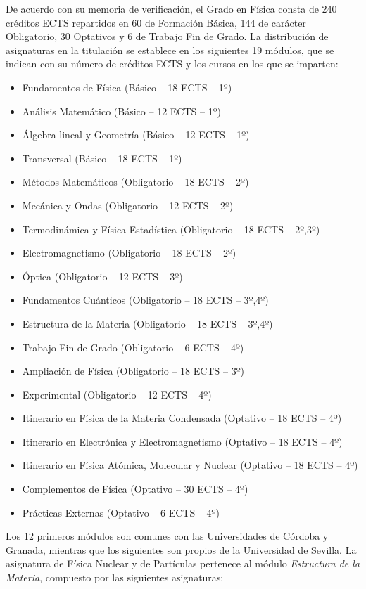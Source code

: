 \documentclass[a4paper,12pt,twoside]{article}
\begin{document}
De acuerdo con su memoria de verificación, el Grado en Física consta de 240 créditos ECTS repartidos en 60 de Formación Básica, 144 de carácter Obligatorio, 30 Optativos y 6 de Trabajo Fin de Grado. La distribución de asignaturas en la titulación se establece en los siguientes 19 módulos, que se indican con su número de créditos ECTS y los cursos en los que se imparten:
\begin{itemize}
\item Fundamentos de Física (Básico -- 18 ECTS -- 1º)
\item Análisis Matemático (Básico -- 12 ECTS -- 1º)
\item Álgebra lineal y Geometría (Básico -- 12 ECTS -- 1º)
\item Transversal (Básico -- 18 ECTS -- 1º)
\item Métodos Matemáticos  (Obligatorio -- 18 ECTS -- 2º)
\item Mecánica y Ondas (Obligatorio -- 12 ECTS -- 2º)
\item Termodinámica y Física Estadística (Obligatorio -- 18 ECTS -- 2º,3º)
\item Electromagnetismo (Obligatorio -- 18 ECTS -- 2º)
\item Óptica (Obligatorio -- 12 ECTS -- 3º)
\item Fundamentos Cuánticos (Obligatorio -- 18 ECTS -- 3º,4º)
\item Estructura de la Materia (Obligatorio -- 18 ECTS -- 3º,4º)
\item Trabajo Fin de Grado (Obligatorio -- 6 ECTS -- 4º)
\item Ampliación de Física (Obligatorio -- 18 ECTS -- 3º)
\item Experimental (Obligatorio -- 12 ECTS -- 4º)
\item Itinerario en Física de la Materia Condensada (Optativo -- 18 ECTS -- 4º)
\item Itinerario en Electrónica y Electromagnetismo (Optativo -- 18 ECTS -- 4º)
\item Itinerario en Física Atómica, Molecular y Nuclear (Optativo -- 18 ECTS -- 4º)
\item Complementos de Física (Optativo -- 30 ECTS -- 4º)
\item Prácticas Externas (Optativo -- 6 ECTS -- 4º)
\end{itemize} 
 
Los 12 primeros módulos son comunes con las Universidades de Córdoba y Granada, mientras que los siguientes son propios de la Universidad de Sevilla. La asignatura de Física Nuclear y de Partículas pertenece al módulo \textit{Estructura de la Materia}, compuesto por las siguientes asignaturas:
\end{document}

